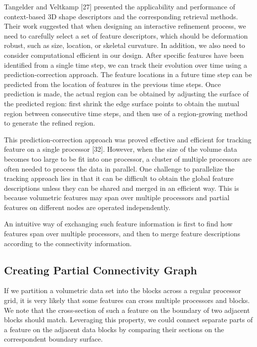 \documentclass[10pt, conference, compsocconf]{IEEEtran}
\begin{document}
Tangelder and Veltkamp [27] presented the applicability and performance of context-based 3D shape descriptors and the corresponding retrieval methods. Their work suggested that when designing an interactive refinement process, we need to carefully select a set of feature descriptors, which should be deformation robust, such as size, location, or skeletal curvature. In addition, we also need to consider computational efficient in our design. 
After specific features have been identified from a single time step, we can track their evolution over time using a prediction-correction approach. The feature locations in a future time step can be predicted from the location of features in the previous time steps. Once prediction is made, the actual region can be obtained by adjusting the surface of the predicted region: first shrink the edge surface points to obtain the mutual region between consecutive time steps, and then use of a region-growing method to generate the refined region.

This prediction-correction approach was proved effective and efficient for tracking feature on a single processor [32]. However, when the size of the volume data becomes too large to be fit into one processor, a cluster of multiple processors are often needed to process the data in parallel. One challenge to parallelize the tracking approach lies in that it can be difficult to obtain the global feature descriptions unless they can be shared and merged in an efficient way. This is because volumetric features may span over multiple processors and partial features on different nodes are operated independently.

An intuitive way of exchanging such feature information is first to find how features span over multiple processors, and then to merge feature descriptions according to the connectivity information.

\subsection{Creating Partial Connectivity Graph}
If we partition a volumetric data set into the blocks across a regular processor grid, it is very likely that some features can cross multiple processors and blocks. We note that the cross-section of such a feature on the boundary of two adjacent blocks should match. Leveraging this property, we could connect separate parts of a feature on the adjacent data blocks by comparing their sections on the correspondent boundary surface.
\end{document}
